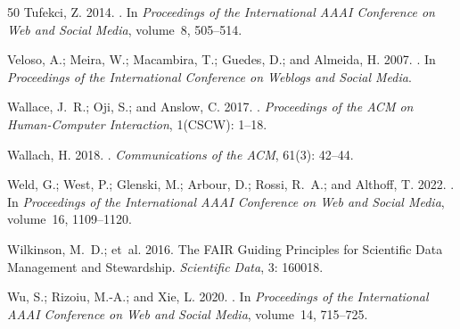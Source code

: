 \begin{thebibliography}{50}
Tufekci, Z. 2014.
.
\newblock In \emph{Proceedings of the International AAAI Conference on Web and Social Media}, volume~8, 505--514.

Veloso, A.; Meira, W.; Macambira, T.; Guedes, D.; and Almeida, H. 2007.
.
\newblock In \emph{Proceedings of the International Conference on Weblogs and Social Media}.

Wallace, J.~R.; Oji, S.; and Anslow, C. 2017.
.
\newblock \emph{Proceedings of the ACM on Human-Computer Interaction}, 1(CSCW): 1--18.

Wallach, H. 2018.
.
\newblock \emph{Communications of the ACM}, 61(3): 42--44.

Weld, G.; West, P.; Glenski, M.; Arbour, D.; Rossi, R.~A.; and Althoff, T. 2022.
.
\newblock In \emph{Proceedings of the International AAAI Conference on Web and Social Media}, volume~16, 1109--1120.

Wilkinson, M.~D.; et~al. 2016.
\newblock The FAIR Guiding Principles for Scientific Data Management and Stewardship.
\newblock \emph{Scientific Data}, 3: 160018.

Wu, S.; Rizoiu, M.-A.; and Xie, L. 2020.
.
\newblock In \emph{Proceedings of the International AAAI Conference on Web and Social Media}, volume~14, 715--725.

\end{thebibliography}
